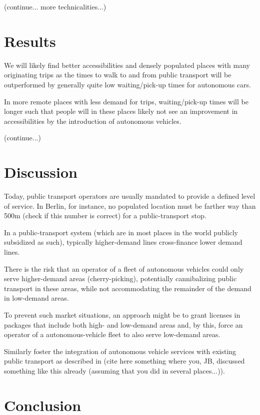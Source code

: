 \documentclass[10pt]{article}
\begin{document}
(continue... more technicalities...)

\section{Results}
We will likely find better accessibilities and densely populated places with many originating trips as the times to walk to and from public transport will be outperformed by generally quite low waiting/pick-up times for autonomous cars.

In more remote places with less demand for trips, waiting/pick-up times will be longer such that people will in these places likely not see an improvement in accessibilities by the introduction of autonomous vehicles.

(continue...)

\section{Discussion}
Today, public transport operators are usually mandated to provide a defined level of service. In Berlin, for instance, no populated location must be farther way than 500m (check if this number is correct) for a public-transport stop.

In a public-transport system (which are in most places in the world publicly subsidized as such), typically higher-demand lines cross-finance lower demand lines.

There is the risk that an operator of a fleet of autonomous vehicles could only serve higher-demand areas (cherry-picking), potentially cannibalizing public transport in these areas, while not accommodating the remainder of the demand in low-demand areas.

To prevent such market situations, an approach might be to grant licenses in packages that include both high- and low-demand areas and, by this, force an operator of a autonomous-vehicle fleet to also serve low-demand areas.

Similarly foster the integration of autonomous vehicle services with existing public transport as described in (cite here something where you, JB, discussed something like this already (assuming that you did in several places...)).

\section{Conclusion}



%
%
\end{document}
